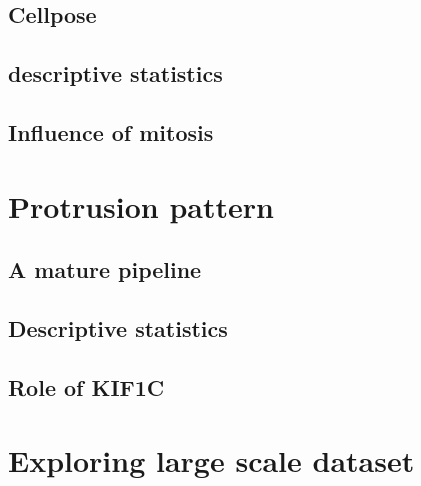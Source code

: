 \subsection{Cellpose}

\subsection{descriptive statistics}

\subsection{Influence of mitosis}


\section{Protrusion pattern}


\subsection{A mature pipeline}

\subsection{Descriptive statistics}

\subsection{Role of KIF1C}


\section{Exploring large scale dataset}
